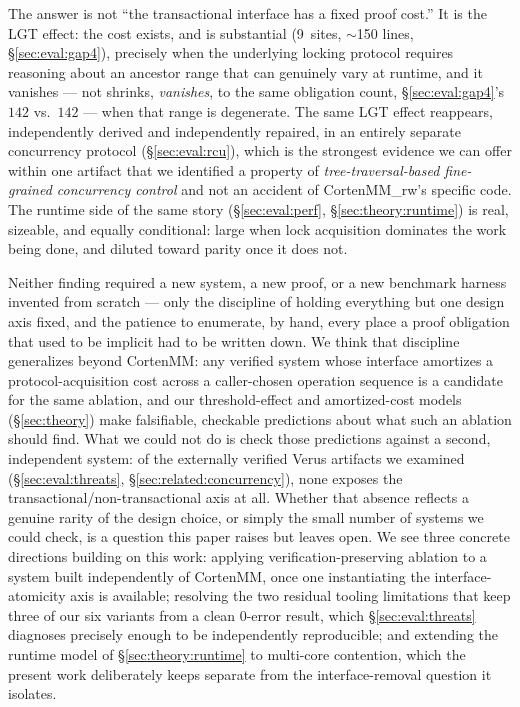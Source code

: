\documentclass[10pt]{article}
\begin{document}
The answer is not ``the transactional interface has a fixed proof
cost.'' It is the LGT effect: the cost exists, and is substantial
(9~sites, $\sim$150 lines, \S\ref{sec:eval:gap4}), precisely when the
underlying locking protocol requires reasoning about an ancestor range
that can genuinely vary at runtime, and it vanishes --- not shrinks,
\emph{vanishes}, to the same obligation count, \S\ref{sec:eval:gap4}'s
$142$ vs.\ $142$ --- when that range is degenerate. The same
LGT effect reappears, independently derived and independently repaired,
in an entirely separate concurrency protocol (\S\ref{sec:eval:rcu}),
which is the strongest evidence we can offer within one artifact that
we identified a property of \emph{tree-traversal-based fine-grained
concurrency control} and not an accident of CortenMM\_rw's specific
code. The runtime side of the same story (\S\ref{sec:eval:perf},
\S\ref{sec:theory:runtime}) is real, sizeable, and equally conditional:
large when lock acquisition dominates the work being done, and diluted
toward parity once it does not.

Neither finding required a new system, a new proof, or a new
benchmark harness invented from scratch --- only the discipline of
holding everything but one design axis fixed, and the patience to
enumerate, by hand, every place a proof obligation that used to be
implicit had to be written down. We think that discipline generalizes
beyond CortenMM: any verified system whose interface amortizes a
protocol-acquisition cost across a caller-chosen operation sequence is
a candidate for the same ablation, and our threshold-effect and
amortized-cost models (\S\ref{sec:theory}) make falsifiable,
checkable predictions about what such an ablation should find. What we
could not do is check those predictions against a second, independent
system: of the externally verified Verus artifacts we examined
(\S\ref{sec:eval:threats}, \S\ref{sec:related:concurrency}), none
exposes the transactional/non-transactional axis at all. Whether that
absence reflects a genuine rarity of the design choice, or simply the
small number of systems we could check, is a question this paper
raises but leaves open. We see three concrete directions building on
this work: applying verification-preserving ablation to a system built
independently of CortenMM, once one instantiating the interface-atomicity
axis is available; resolving the two residual tooling
limitations that keep three of our six variants from a clean
0-error result, which \S\ref{sec:eval:threats} diagnoses precisely
enough to be independently reproducible; and extending the runtime
model of \S\ref{sec:theory:runtime} to multi-core contention, which the
present work deliberately keeps separate from the interface-removal
question it isolates.
\end{document}
